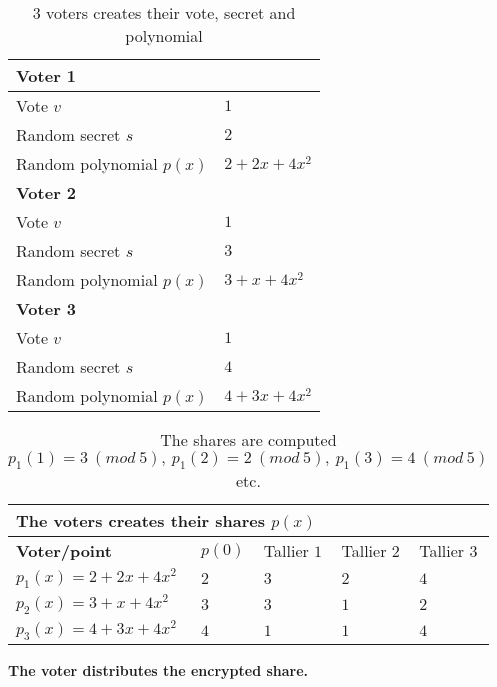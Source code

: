 \begin{table}[H]
\centering
\begin{tabular}{|l|l|}
\hline
\multicolumn{2}{|l|}{\textbf{Voter 1}}        \\ \hline
Vote $v$          & $1$                         \\ \hline
Random secret $s$ & $2$                         \\ \hline
Random polynomial $p(x)$ & $2+2x+4x^2$ \\ \hline
\multicolumn{2}{|l|}{\textbf{Voter 2}}        \\ \hline
Vote $v$          & $1$                         \\ \hline
Random secret $s$ & $3$                         \\ \hline
Random polynomial $p(x)$ & $3+x+4x^2$ \\ \hline
\multicolumn{2}{|l|}{\textbf{Voter 3}}        \\ \hline
Vote $v$          & $1$                         \\ \hline
Random secret $s$ & $4$                         \\ \hline
Random polynomial $p(x)$ & $4+3x+4x^2$ \\ \hline
\end{tabular}
\caption{3 voters creates their vote, secret and polynomial}
\label{my-label}
\end{table}


\begin{table}[H]
\centering
\begin{tabular}{|l|l|l|l|l|}
\hline
\multicolumn{5}{|l|}{\textbf{The voters creates their shares $p(x)$}}                                    \\ \hline
\textbf{Voter/point}            & $p(0)$ & Tallier $1$ & Tallier $2$ & Tallier $3$ \\ \hline
$p_1(x)= 2+2x+4x^2$ &  $2$    & $3$         & $2$         & $4$         \\ \hline
$p_2(x)= 3+x+4x^2$  &  $3$    & $3$         & $1$         & $2$         \\ \hline
$p_3(x)= 4+3x+4x^2$ &  $4$    & $1$         & $1$         & $4$         \\ \hline
\end{tabular}
\caption{The shares are computed $p_1(1)=3 \ (mod \ 5),\ p_1(2)=2 \ (mod \ 5),\ p_1(3)=4 \ (mod \ 5)$ etc.}
\label{my-label}
\end{table}

\noindent
\textbf{The voter distributes the encrypted share.}

